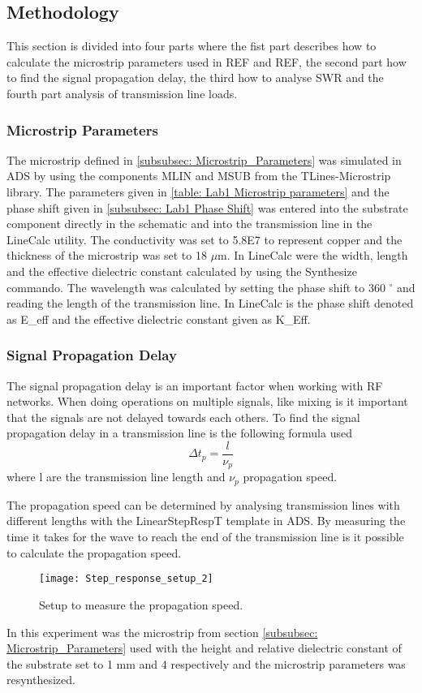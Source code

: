 \documentclass[report.tex]{subfiles}
\begin{document}
\subsection{Methodology}\label{sec:Lab1 methodology}
This section is divided into four parts where the fist part describes how to calculate the microstrip parameters used in REF and REF, the second part how to find the signal propagation delay, the third how to analyse SWR and the fourth part analysis of transmission line loads.
\subsubsection{Microstrip Parameters}
The microstrip defined in \ref{subsubsec: Microstrip_Parameters} was simulated in ADS by using the components MLIN and MSUB from the TLines-Microstrip library. The parameters given in \ref{table: Lab1 Microstrip parameters} and the phase shift given in \ref{subsubsec: Lab1 Phase Shift} was entered into the substrate component directly in the schematic and into the transmission line in the LineCalc utility. The conductivity was set to 5.8E7 to represent copper and the thickness of the microstrip was set to 18 $\mu$m. In LineCalc were the width, length and the effective dielectric constant calculated by using the Synthesize commando. The wavelength was calculated by setting the phase shift to 360 $^\circ$ and reading the length of the transmission line. In LineCalc is the phase shift denoted as E\_eff and the effective dielectric constant given as K\_Eff.

\subsubsection{Signal Propagation Delay}
The signal propagation delay is an important factor when working with RF networks. When doing operations on multiple signals, like mixing is it important that the signals are not delayed towards each others. To find the signal propagation delay in a transmission line is the following formula used
\begin{equation}\label{eq: Lab1 propagation delay}
	\Delta t_p = \dfrac{l}{\nu_p}
\end{equation}
where l are the transmission line length and $\nu_p$ propagation speed.

The propagation speed can be determined by analysing transmission lines with different lengths with the LinearStepRespT template in ADS. By measuring the time it takes for the wave to reach the end of the transmission line is it possible to calculate the propagation speed.
\begin{figure}[H]
	\texttt{[image: Step\_response\_setup\_2]}
	\caption{Setup to measure the propagation speed.}
\end{figure}
In this experiment was the microstrip from section \ref{subsubsec: Microstrip_Parameters} used with the height and relative dielectric constant of the substrate set to 1 mm and 4 respectively and the microstrip parameters was resynthesized.
\end{document}
